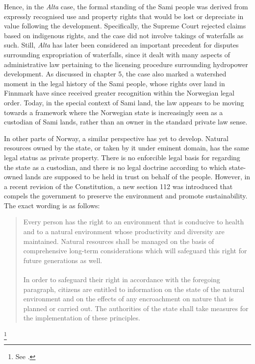 Hence, in the {\it Alta} case, the formal standing of the Sami people was derived from expressly recognised use and property rights that would be lost or depreciate in value following the development. Specifically, the Supreme Court rejected claims based on indigenous rights, and the case did not involve takings of waterfalls as such. Still, {\it Alta} has later been considered an important precedent for disputes surrounding expropriation of waterfalls, since it dealt with many aspects of administrative law pertaining to the licensing procedure surrounding hydropower development. As discussed in chapter 5, the case also marked a watershed moment in the legal history of the Sami people, whose rights over land in Finnmark have since received greater recognition within the Norwegian legal order. Today, in the special context of Sami land, the law appears to be moving towards a framework where the Norwegian state is increasingly seen as a custodian of Sami lands, rather than an owner in the standard private law sense.

In other parts of Norway, a similar perspective has yet to develop. Natural resources owned by the state, or taken by it under eminent domain, has the same legal status as private property. There is no enforcible legal basis for regarding the state as a custodian, and there is no legal doctrine according to which state-owned lands are supposed to be held in trust on behalf of the people. However, in a recent revision of the Constitution, a new section 112 was introduced that compels the government to preserve the environment and promote sustainability. The exact wording is as follows:

\begin{quote}
Every person has the right to an environment that is conducive to
health and to a natural environment whose productivity and diversity
are maintained. Natural resources shall be managed on the basis of
comprehensive long-term considerations which will safeguard this
right for future generations as well. \\ \\

In order to safeguard their right in accordance with the foregoing
paragraph, citizens are entitled to information on the state of the
natural environment and on the effects of any encroachment on nature
that is planned or carried out. The authorities of the state shall take measures for the
implementation of these principles.
\end{quote}\footnote{See \cite[112]{grunnloven14}.}

